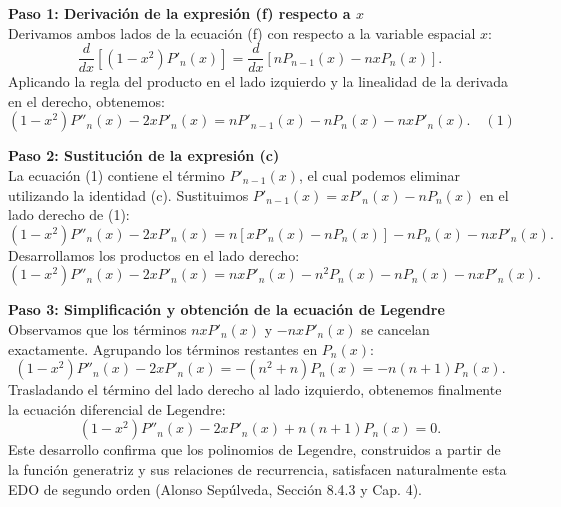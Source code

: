 \documentclass[a4paper]{article}
\begin{document}
\vspace{0.3cm}
\noindent\textbf{Paso 1: Derivación de la expresión (f) respecto a $x$}\\
Derivamos ambos lados de la ecuación (f) con respecto a la variable espacial $x$:
$$
\frac{d}{dx}\left[ (1 - x^2)P'_n(x) \right] = \frac{d}{dx}\left[ n P_{n-1}(x) - n x P_n(x) \right].
$$
Aplicando la regla del producto en el lado izquierdo y la linealidad de la derivada en el derecho, obtenemos:
$$
(1 - x^2)P''_n(x) - 2x P'_n(x) = n P'_{n-1}(x) - n P_n(x) - n x P'_n(x). \quad (1)
$$

\vspace{0.3cm}
\noindent\textbf{Paso 2: Sustitución de la expresión (c)}\\
La ecuación (1) contiene el término $P'_{n-1}(x)$, el cual podemos eliminar utilizando la identidad (c). Sustituimos $P'_{n-1}(x) = x P'_n(x) - n P_n(x)$ en el lado derecho de (1):
$$
(1 - x^2)P''_n(x) - 2x P'_n(x) = n \left[ x P'_n(x) - n P_n(x) \right] - n P_n(x) - n x P'_n(x).
$$
Desarrollamos los productos en el lado derecho:
$$
(1 - x^2)P''_n(x) - 2x P'_n(x) = n x P'_n(x) - n^2 P_n(x) - n P_n(x) - n x P'_n(x).
$$

\vspace{0.3cm}
\noindent\textbf{Paso 3: Simplificación y obtención de la ecuación de Legendre}\\
Observamos que los términos $n x P'_n(x)$ y $- n x P'_n(x)$ se cancelan exactamente. Agrupando los términos restantes en $P_n(x)$:
$$
(1 - x^2)P''_n(x) - 2x P'_n(x) = - (n^2 + n) P_n(x) = - n(n+1) P_n(x).
$$
Trasladando el término del lado derecho al lado izquierdo, obtenemos finalmente la ecuación diferencial de Legendre:
$$
(1 - x^2)P''_n(x) - 2x P'_n(x) + n(n+1)P_n(x) = 0.
$$
Este desarrollo confirma que los polinomios de Legendre, construidos a partir de la función generatriz y sus relaciones de recurrencia, satisfacen naturalmente esta EDO de segundo orden (Alonso Sepúlveda, Sección 8.4.3 y Cap. 4).
\end{document}

